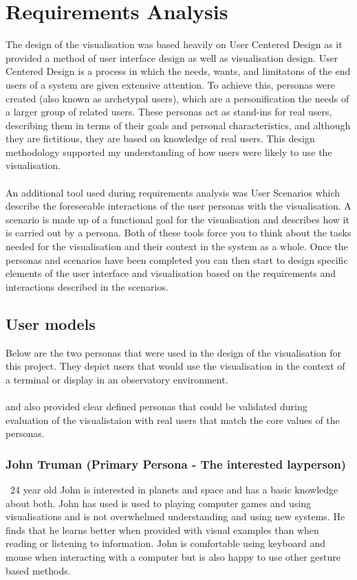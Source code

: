 \chapter{Requirements Analysis}\label{C:ra}
The design of the visualisation was based heavily on User Centered Design as it provided a method of user interface design as well as visualisation design. User Centered Design is a process in which the needs, wants, and limitatons of the end users of a system are given extensive attention. To achieve this, personas were created (also known as archetypal users), which are a personification the needs of a larger group of related users. These personas act as stand-ins for real users, describing them in terms of their goals and personal characteristics, and although they are fictitious, they are based on knowledge of real users. This design methodology supported my understanding of how users were likely to use the visualisation.
\\\\
An additional tool used during requirements analysis was User Scenarios which describe the foreseeable interactions of the user personas with the visualisation. A scenario is made up of a functional goal for the visualisation and describes how it is carried out by a persona. Both of these tools force you to think about the tasks needed for the visualisation and their context in the system as a whole. Once the personas and scenarios have been completed you can then start to design specific elements of the user interface and visualisation based on the requirements and interactions described in the scenarios.
\section{User models}
Below are the two personas that were used in the design of the visualisation for this project. They depict users that would use the visualisation in the context of a terminal or display in an observatory environment. 
\\\\
 and also provided clear defined personas that could be validated during evaluation of the visualistaion with real users that match the core values of the personas.
\subsection{John Truman (Primary Persona -  The interested layperson)}\
24 year old John is interested in planets and space and has a basic knowledge about both. John has used is used to playing computer games and using visualisations and is not overwhelmed understanding and using new systems. He finds that he learns better when provided with visual examples than when reading or listening to information. John is comfortable using keyboard and mouse when interacting with a computer but is also happy to use other gesture based methods. 
